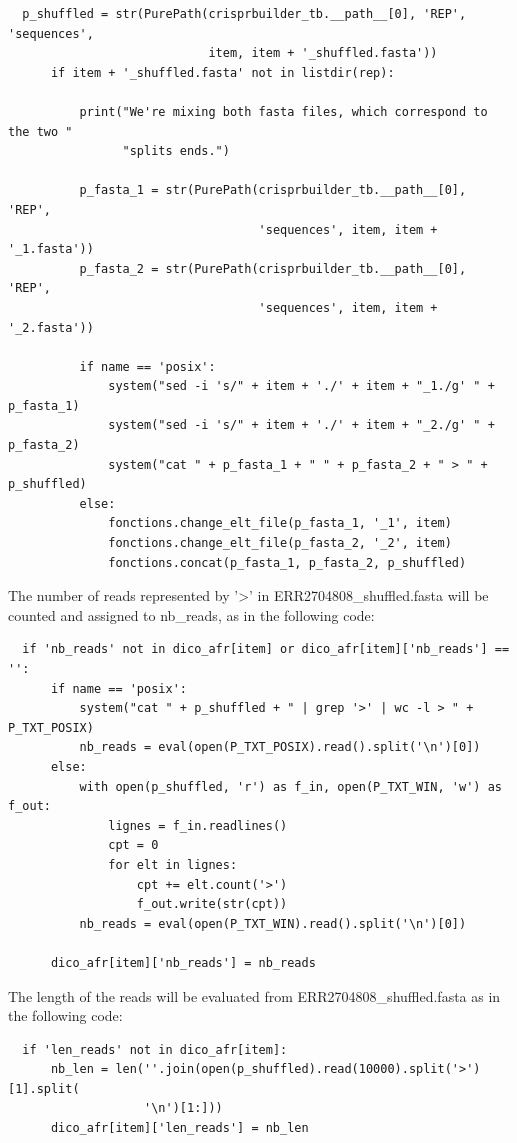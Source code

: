 \documentclass[twoside,a4paper,11pt,frenchb,openany]{report}
\begin{document}
\begin{verbatim}
  p_shuffled = str(PurePath(crisprbuilder_tb.__path__[0], 'REP', 'sequences',
                            item, item + '_shuffled.fasta'))
      if item + '_shuffled.fasta' not in listdir(rep):

          print("We're mixing both fasta files, which correspond to the two "
                "splits ends.")

          p_fasta_1 = str(PurePath(crisprbuilder_tb.__path__[0], 'REP',
                                   'sequences', item, item + '_1.fasta'))
          p_fasta_2 = str(PurePath(crisprbuilder_tb.__path__[0], 'REP',
                                   'sequences', item, item + '_2.fasta'))

          if name == 'posix':
              system("sed -i 's/" + item + './' + item + "_1./g' " + p_fasta_1)
              system("sed -i 's/" + item + './' + item + "_2./g' " + p_fasta_2)
              system("cat " + p_fasta_1 + " " + p_fasta_2 + " > " + p_shuffled)
          else:
              fonctions.change_elt_file(p_fasta_1, '_1', item)
              fonctions.change_elt_file(p_fasta_2, '_2', item)
              fonctions.concat(p_fasta_1, p_fasta_2, p_shuffled)
\end{verbatim}

    The number of reads represented by '\textgreater{}' in
ERR2704808\_shuffled.fasta will be counted and assigned to nb\_reads, as
in the following code:

\begin{verbatim}
  if 'nb_reads' not in dico_afr[item] or dico_afr[item]['nb_reads'] == '':
      if name == 'posix':
          system("cat " + p_shuffled + " | grep '>' | wc -l > " + P_TXT_POSIX)
          nb_reads = eval(open(P_TXT_POSIX).read().split('\n')[0])
      else:
          with open(p_shuffled, 'r') as f_in, open(P_TXT_WIN, 'w') as f_out:
              lignes = f_in.readlines()
              cpt = 0
              for elt in lignes:
                  cpt += elt.count('>')
                  f_out.write(str(cpt))
          nb_reads = eval(open(P_TXT_WIN).read().split('\n')[0])

      dico_afr[item]['nb_reads'] = nb_reads
\end{verbatim}

    The length of the reads will be evaluated from
ERR2704808\_shuffled.fasta as in the following code:

\begin{verbatim}
  if 'len_reads' not in dico_afr[item]:
      nb_len = len(''.join(open(p_shuffled).read(10000).split('>')[1].split(
                   '\n')[1:]))
      dico_afr[item]['len_reads'] = nb_len
\end{verbatim}
\end{document}

